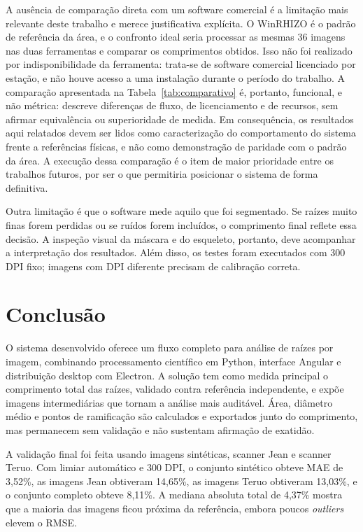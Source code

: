 \documentclass[12pt]{article}
\begin{document}
A ausência de comparação direta com um software comercial é a limitação mais relevante deste trabalho e merece justificativa explícita. O WinRHIZO \cite{arsenault1995winrhizo} é o padrão de referência da área, e o confronto ideal seria processar as mesmas 36 imagens nas duas ferramentas e comparar os comprimentos obtidos. Isso não foi realizado por indisponibilidade da ferramenta: trata-se de software comercial licenciado por estação, e não houve acesso a uma instalação durante o período do trabalho. A comparação apresentada na Tabela~\ref{tab:comparativo} é, portanto, funcional, e não métrica: descreve diferenças de fluxo, de licenciamento e de recursos, sem afirmar equivalência ou superioridade de medida. Em consequência, os resultados aqui relatados devem ser lidos como caracterização do comportamento do sistema frente a referências físicas, e não como demonstração de paridade com o padrão da área. A execução dessa comparação é o item de maior prioridade entre os trabalhos futuros, por ser o que permitiria posicionar o sistema de forma definitiva.

Outra limitação é que o software mede aquilo que foi segmentado. Se raízes muito finas forem perdidas ou se ruídos forem incluídos, o comprimento final reflete essa decisão. A inspeção visual da máscara e do esqueleto, portanto, deve acompanhar a interpretação dos resultados. Além disso, os testes foram executados com 300 DPI fixo; imagens com DPI diferente precisam de calibração correta.

\section{Conclusão}

O sistema desenvolvido oferece um fluxo completo para análise de raízes por imagem, combinando processamento científico em Python, interface Angular e distribuição desktop com Electron. A solução tem como medida principal o comprimento total das raízes, validado contra referência independente, e expõe imagens intermediárias que tornam a análise mais auditável. Área, diâmetro médio e pontos de ramificação são calculados e exportados junto do comprimento, mas permanecem sem validação e não sustentam afirmação de exatidão.

A validação final foi feita usando imagens sintéticas, scanner Jean e scanner Teruo. Com limiar automático e 300 DPI, o conjunto sintético obteve MAE de 3,52\%, as imagens Jean obtiveram 14,65\%, as imagens Teruo obtiveram 13,03\%, e o conjunto completo obteve 8,11\%. A mediana absoluta total de 4,37\% mostra que a maioria das imagens ficou próxima da referência, embora poucos \textit{outliers} elevem o RMSE.
\end{document}
